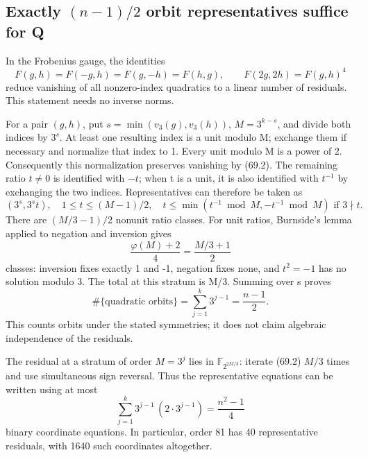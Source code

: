 \documentclass[11pt,reqno]{amsart}
\theoremstyle{plain}
\begin{document}
\subsection{\texorpdfstring{Exactly \((n-1)/2\) orbit representatives suffice for Q}{Exactly (n-1)/2 orbit representatives suffice for Q}}\label{sec:69.2}

In the Frobenius gauge, the identities
\begin{equation*}
 F(g,h)=F(-g,h)=F(g,-h)=F(h,g),\qquad
 F(2g,2h)=F(g,h)^4
 \tag{69.2}
\end{equation*}
reduce vanishing of all nonzero-index quadratics to a linear number
of residuals. This statement needs no inverse norms.

For a pair \((g,h)\), put
\(s=\min(v_3(g),v_3(h))\), \(M=3^{k-s}\), and divide both
indices by \(3^s\). At least one resulting index is a unit modulo
M; exchange them if necessary and normalize that index to 1.
Every unit modulo M is a power of 2. Consequently this normalization
preserves vanishing by (69.2). The remaining ratio \(t\ne0\) is
identified with \(-t\); when t is a unit, it is also identified
with \(t^{-1}\) by exchanging the two indices. Representatives
can therefore be taken as
\begin{equation*}
 (3^s,3^s t),\quad
 1\le t\le(M-1)/2,\quad
 t\le\min(t^{-1}\bmod M,-t^{-1}\bmod M)
 \text{ if }3\nmid t.
 \tag{69.3}
\end{equation*}
There are \((M/3-1)/2\) nonunit ratio classes. For unit ratios,
Burnside's lemma applied to negation and inversion gives
\[
 \frac{\varphi(M)+2}{4}=\frac{M/3+1}{2}
\]
classes: inversion fixes exactly 1 and -1, negation fixes none,
and \(t^2=-1\) has no solution modulo 3. The total at this
stratum is M/3. Summing over s proves
\begin{equation*}
 \boxed{\#\{\text{quadratic orbits}\}
       =\sum_{j=1}^{k}3^{j-1}=\frac{n-1}{2}.}
 \tag{69.4}
\end{equation*}
This counts orbits under the stated symmetries; it does not claim
algebraic independence of the residuals.

The residual at a stratum of order \(M=3^j\) lies in
\(\mathbb F_{2^{2M/3}}\): iterate (69.2) \(M/3\) times and
use simultaneous sign reversal. Thus the representative equations
can be written using at most
\begin{equation*}
 \sum_{j=1}^k 3^{j-1}\,(2\cdot3^{j-1})
 =\frac{n^2-1}{4}
 \tag{69.5}
\end{equation*}
binary coordinate equations. In particular, order 81 has 40
representative residuals, with 1640 such coordinates altogether.
\end{document}
